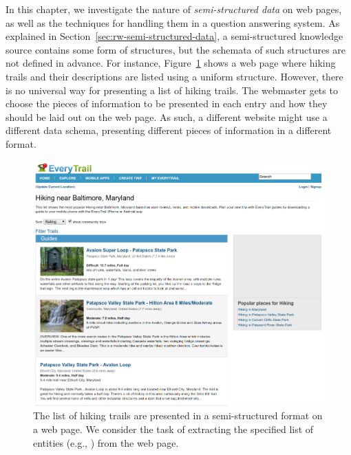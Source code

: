 In this chapter,
we investigate the nature of \emph{semi-structured data}
on web pages,
as well as the techniques for handling them in
a question answering system.
As explained in Section~\ref{sec:rw-semi-structured-data},
a semi-structured knowledge source contains some form of structures,
but the schemata of such structures are not defined in advance.
For instance,
Figure~\ref{fig:openweb-running-ex} shows a web page
where hiking trails and their descriptions
are listed using a uniform structure.
However, there is no universal way
for presenting a list of hiking trails.
The webmaster gets to choose the pieces of information
to be presented in each entry
and how they should be laid out on the web page.
As such,
a different website might use a different data schema,
presenting different pieces of information in a different format.

\begin{figure}[t]
\centering
\includegraphics[scale=0.35]{figures/openweb/hiking-trails.png}
\caption[The list of hiking trails are presented in a semi-structured format on a web page.]{
The list of hiking trails are presented in a semi-structured format
on a web page. We consider the task of extracting
the specified list of entities
(e.g., )
from the web page.}
\label{fig:openweb-running-ex}
\end{figure}



